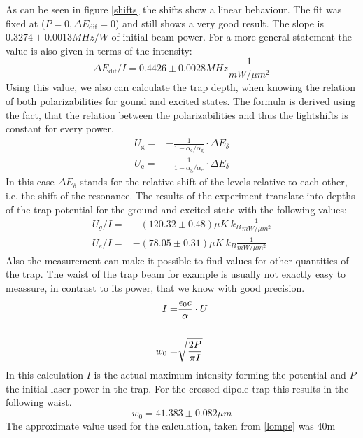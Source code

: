 As can be seen in figure \ref{shifts} the shifts show a linear behaviour. The fit was fixed at ($P=0, \Delta E_\mathrm{dif}=0$) and still shows a very good result. The slope is $0.3274\pm 0.0013\unit{MHz/W}$ of initial beam-power. For a more general statement the value is also given in terms of the intensity:
\begin{equation}
\Delta E_\mathrm{dif}/I=0.4426\pm 0.0028\unit{MHz\frac{1}{mW/\mu m^2}}
\end{equation}
Using this value, we also can calculate the trap depth, when knowing the relation of both polarizabilities for gound and excited states. The formula is derived using the fact, that the relation between the polarizabilities and thus the lightshifts is constant for every power.
\begin{align}
U_{\mathrm{g}}=&-\frac{1}{1-\alpha_{\mathrm{e}}/\alpha_{\mathrm{g}}}\cdot \Delta E_\delta\\
U_{\mathrm{e}}=&-\frac{1}{1-\alpha_{\mathrm{g}}/\alpha_{\mathrm{e}}}\cdot \Delta E_\delta
\end{align}
In this case $\Delta E_\delta$ stands for the relative shift of the levels relative to each other, i.e. the shift of the resonance. The results of the experiment translate into depths of the trap potential for the ground and excited state with the following values:
\begin{align}
U_g/I=&-(120.32\pm 0.48)\unit{\mu K\ k_B\frac{1}{mW/\mu m^2}}\\
U_e/I=&-(78.05\pm 0.31)\unit{\mu K\ k_B\frac{1}{mW/\mu m^2}}
\end{align}
Also the measurement can make it possible to find values for other quantities of the trap. The waist of the trap beam for example is usually not exactly easy to meassure, in contrast to its power, that we know with good precision.
\begin{align}
I=&\frac{\epsilon_0 c}{\alpha}\cdot U\\\notag\\
w_0=&\sqrt{\frac{2P}{\pi I}}
\end{align}
In this calculation $I$ is the actual maximum-intensity forming the potential and $P$ the initial laser-power in the trap. For the crossed dipole-trap this results in the following waist.
\begin{equation}
w_0=41.383\pm 0.082\unit{\mu m}
\end{equation}
The approximate value used for the calculation, taken from \ref{lompe} was 40\mu m 

